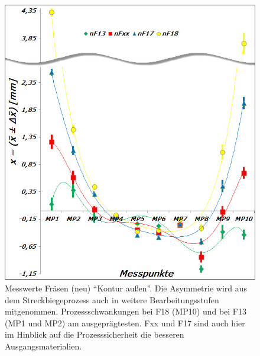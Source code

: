 \documentclass[12pt,a4paper,parskip,twoside,BCOR5mm,headsepline]{scrartcl}
\begin{document}
\begin{figure}[hbtp]
\centering
\includegraphics[width=.8\textwidth]{fraesneumess}
\caption{Messwerte Fräsen (neu) "`Kontur außen"'. Die Asymmetrie wird  aus dem Streckbiegeprozess auch in weitere Bearbeitungsstufen mitgenommen. Prozessschwankungen bei F18 (MP10) und bei F13 (MP1 und MP2) am ausgeprägtesten. Fxx und F17 sind auch hier im Hinblick auf die Prozesssicherheit die besseren Ausgangsmaterialien.}
\label{fig:fraesneumess}
\end{figure}
\end{document}
